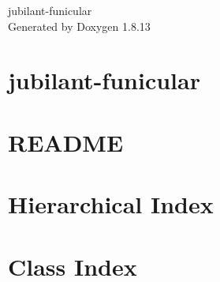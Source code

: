\documentclass[twoside]{book}
\newcommand{\+}{\discretionary{\mbox{\scriptsize$\hookleftarrow$}}{}{}}
\newcommand{\clearemptydoublepage}{%
  \newpage{\pagestyle{empty}\cleardoublepage}%
}
\begin{document}
\hypersetup{pageanchor=false,
             bookmarksnumbered=true,
             pdfencoding=unicode
            }
\begin{titlepage}
\vspace*{7cm}
\begin{center}%
{\Large jubilant-\/funicular }\\
\vspace*{1cm}
{\large Generated by Doxygen 1.8.13}\\
\end{center}
\end{titlepage}
\clearemptydoublepage
{}
\tableofcontents
\clearemptydoublepage
{}
\hypersetup{pageanchor=true}

\chapter{jubilant-\/funicular}
\label{index}\hypertarget{index}{}
\chapter{R\+E\+A\+D\+ME}
\label{md_doxygen-theme_README}

\chapter{Hierarchical Index}

\chapter{Class Index}

\end{document}
